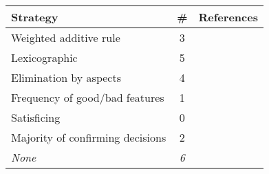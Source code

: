 
\begin{supertabular}[c]{lcp{9.5em}}
\toprule
Strategy & \# & References\tabularnewline
\midrule
Weighted additive rule       & 3 & \citep{Amirkhanov:2010,Bergner:2013,Brecheisen:2009}\tabularnewline
Lexicographic & 5 & \citep{Afzal:2011,Berger:2011,Luboschik:2014,Marks:1997,Torsney-Weir:2011}\tabularnewline
Elimination by aspects & 4 & \citep{Booshehrian:2012,Matkovic:2009,Spence:1995,Waser:2010}\tabularnewline
Frequency of good/bad features & 1 & \citep{Coffey:2013}\tabularnewline
Satisficing & 0 & \tabularnewline
Majority of confirming decisions & 2 & \citep{Bruckner:2010,Pretorius:2011}\tabularnewline
\textit{None} & \textit{6} & \textit{\citep{Guo:2009,Konyha:2006,Matkovic:2008,Piringer:2010,Potter:2009,Unger:2012}}\tabularnewline
\bottomrule
\end{supertabular}
